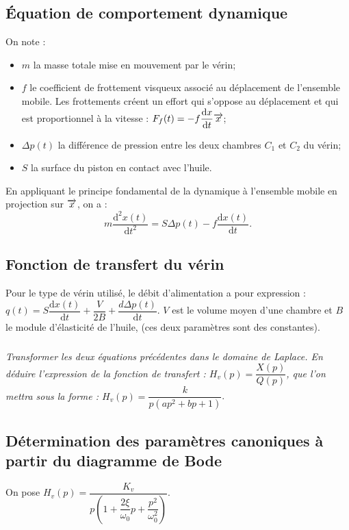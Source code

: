 \documentclass[10pt,fleqn]{article} %
\begin{document}
\begin{multicols}{2}
\subsection*{Équation de comportement dynamique}
On note : 
\begin{itemize}
\item $m$ la masse totale mise en mouvement par le vérin;
\item $f$ le coefficient de frottement visqueux associé au déplacement de l’ensemble mobile. Les frottements créent un effort qui s’oppose au déplacement et qui est proportionnel à la vitesse : $F_f(t)=-f\dfrac{\text{d} x}{\text{d} t} \overrightarrow{x}$;
\item $\Delta p(t)$ la différence de pression entre les deux chambres $C_1$ et $C_2$ du vérin;
\item $S$ la surface du piston en contact avec l’huile.
\end{itemize}
En appliquant le principe fondamental de la dynamique à l’ensemble mobile en projection sur $\overrightarrow{x}$, on a : 
$$m\dfrac{\text{d}^2 x(t) }{\text{d}t^2}=S\Delta p(t)-f\dfrac{\text{d} x(t) }{\text{d}t}.$$



\subsection*{Fonction de transfert du vérin}
Pour le type de vérin utilisé, le débit d'alimentation a pour expression : $q(t)=S\dfrac{\text{d}x(t)}{\text{d} t}+\dfrac{V}{2B}+\dfrac{d\Delta p(t)}{\text{d}t}$. $V$ est le volume moyen d’une chambre et $B$ le module d’élasticité de l’huile, (ces deux paramètres sont des constantes).

\subparagraph{}\textit{Transformer les deux équations précédentes dans le domaine de Laplace. En déduire l’expression de la fonction de transfert : $H_v(p)=\dfrac{X(p)}{Q(p)}$, que l’on mettra sous la forme : $H_v(p)=\dfrac{k}{p\left( ap^2 + bp + 1\right)}$}.


\subsection*{Détermination des paramètres canoniques à partir du diagramme de Bode}

On pose $H_v(p)=\dfrac{K_v}{p\left( 1+\dfrac{2\xi}{\omega_0} p + \dfrac{p^2}{\omega_0^2} \right)}$. 


\end{multicols}
\end{document}
